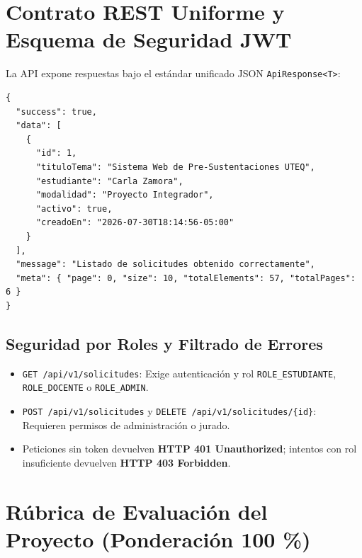 \documentclass[10pt,a4paper]{article}
\begin{document}
\vspace{0.3cm}

\section{Contrato REST Uniforme y Esquema de Seguridad JWT}

La API expone respuestas bajo el estándar unificado JSON \texttt{ApiResponse<T>}:

\begin{lstlisting}[caption={Respuesta Paginada Uniforme HTTP 200 OK}]
{
  "success": true,
  "data": [
    {
      "id": 1,
      "tituloTema": "Sistema Web de Pre-Sustentaciones UTEQ",
      "estudiante": "Carla Zamora",
      "modalidad": "Proyecto Integrador",
      "activo": true,
      "creadoEn": "2026-07-30T18:14:56-05:00"
    }
  ],
  "message": "Listado de solicitudes obtenido correctamente",
  "meta": { "page": 0, "size": 10, "totalElements": 57, "totalPages": 6 }
}
\end{lstlisting}

\subsection{Seguridad por Roles y Filtrado de Errores}
\begin{itemize}
    \item \texttt{GET /api/v1/solicitudes}: Exige autenticación y rol \texttt{ROLE\_ESTUDIANTE}, \texttt{ROLE\_DOCENTE} o \texttt{ROLE\_ADMIN}.
    \item \texttt{POST /api/v1/solicitudes} y \texttt{DELETE /api/v1/solicitudes/\{id\}}: Requieren permisos de administración o jurado.
    \item Peticiones sin token devuelven \textbf{HTTP 401 Unauthorized}; intentos con rol insuficiente devuelven \textbf{HTTP 403 Forbidden}.
\end{itemize}

\vspace{0.3cm}

\section{Rúbrica de Evaluación del Proyecto (Ponderación 100 \%)}
\end{document}
